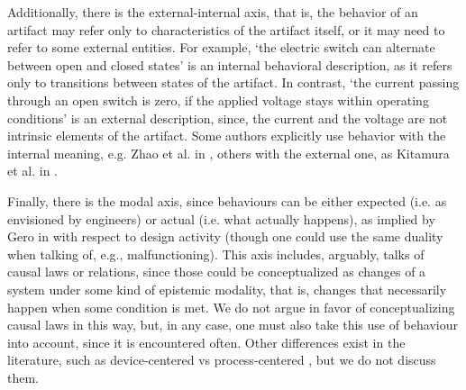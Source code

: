 \documentclass[sw]{iosart2x}
\newcommand{\TODO}[1]{{\color{red} #1
}}
\newcommand{\myComment}[1]{{\unskip \ignorespaces}}
\begin{document}
Additionally, there is the external-internal axis, that is, the behavior of an artifact may refer only to characteristics of the artifact itself, or it may need to refer to some external entities.
For example, `the electric switch can alternate between open and closed states' is an internal behavioral description, as it refers only to transitions between states of the artifact.
In contrast, `the current passing through an open switch is zero, if the applied voltage stays within operating conditions' is an external description, since, the current and the voltage are not intrinsic elements of the artifact. %
Some authors explicitly use behavior with the internal meaning, e.g. Zhao et al. in \cite{zhaoStateBehaviorFunction2019}, others with the external one, as Kitamura et al. in \cite{kitamuraOntologybasedSystematizationFunctional2004}.%

Finally, there is the modal axis, since \myComment{for \textcolor{blue}{(since? considering that?)}} behaviours can be \myComment{\textcolor{blue}{(either)}} either expected (i.e. as envisioned by engineers) or actual (i.e. what actually happens), as implied by Gero in \cite{geroSituatedFunctionBehaviour2004} with respect to design activity (though one could use the same duality when talking of, e.g., malfunctioning).
This axis includes, arguably, talks of causal laws or relations, since those could be conceptualized as changes of a system under some kind of epistemic modality, that is, changes that necessarily happen when some condition is met.
We do not argue in favor of conceptualizing causal laws in this way, but, in any case, one must also take this use of behaviour into account, since it is encountered often. %
Other differences exist in the literature, such as device-centered vs process-centered \cite{chandrasekaranFunctionDeviceRepresentation2000}, but we do not discuss them. 

\end{document}
